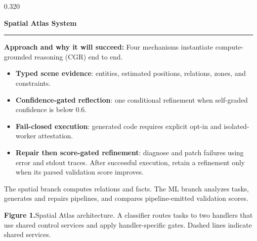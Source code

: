 \documentclass{beamer}
\newenvironment{possection}[2]{%
  \par\vspace{0.10cm}%
  \noindent{\color{ncgreendark}\bfseries\large #1}\hspace{0.42em}%
  {\color{ncink}\bfseries\large #2}\par\vspace{-0.20cm}%
  \noindent\textcolor{ncline}{\rule{\linewidth}{0.9pt}}\par\vspace{0cm}%
  \begin{minipage}{\linewidth}%
}{%
  \end{minipage}\par\vspace{0.40cm}%
}
\newcommand{\heil}[1]{{\color{ncink}\bfseries #1:}\hspace{0.3em}}
\newcommand{\figcap}[2]{%
  \par\vspace{0.18cm}%
  \raggedright{\color{ncmuted}\normalsize\textbf{#1}\hspace{0.3em}#2\par}%
}
\begin{document}
\begin{frame}[t]
\begin{columns}[t,onlytextwidth]
\begin{column}{0.320\textwidth}
\begin{possection}{2.}{Spatial Atlas System}
\begin{minipage}[t]{0.43\linewidth}
    \end{minipage}\hfill
    \begin{minipage}[t]{0.525\linewidth}
      \vspace{0pt}
      \raggedright
      \heil{Approach and why it will succeed} Four mechanisms instantiate
      compute-grounded reasoning (CGR) end to end.
      \par\vspace{0.18cm}
      \small
      \begin{itemize}\setlength{\itemsep}{0.08cm}
        \item \textbf{Typed scene evidence}: entities, estimated positions,
              relations, zones, and constraints.
        \item \textbf{Confidence-gated reflection}: one conditional refinement when
              self-graded confidence is below $0.6$.
        \item \textbf{Fail-closed execution}: generated code requires explicit opt-in
              and isolated-worker attestation.
        \item \textbf{Repair then score-gated refinement}: diagnose and patch failures
              using error and stdout traces. After successful execution, retain a
              refinement only when its parsed validation score improves.
      \end{itemize}
      \par\vspace{0.18cm}
      The spatial branch computes relations and facts. The ML branch analyzes tasks,
      generates and repairs pipelines, and compares pipeline-emitted validation scores.
    \end{minipage}
    \figcap{Figure 1.}{Spatial Atlas architecture. A classifier routes tasks to two
    handlers that use shared control services and apply handler-specific gates.
    Dashed lines indicate shared services.}
  \end{possection}


\end{column}
\end{columns}
\end{frame}
\end{document}
